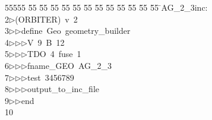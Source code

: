%
%
\begin{tabbing}
55555 \= 55 \= 55 \= 55 \= 55 \= 55 \= 55 \= 55 \= 55 \= 55 \= 55 \= 55 \= 55 \= \>AG\_2\_3inc:\\[0pt]
2\>$\triangleright$\>(ORBITER)\ v\ 2\ \\[0pt]
3\>$\triangleright$\>$\triangleright$\>define\ Geo\ geometry\_builder\ \\[0pt]
4\>$\triangleright$\>$\triangleright$\>$\triangleright$\>V\ 9\ B\ 12\ \\[0pt]
5\>$\triangleright$\>$\triangleright$\>$\triangleright$\>TDO\ 4\ fuse\ 1\ \\[0pt]
6\>$\triangleright$\>$\triangleright$\>$\triangleright$\>fname\_GEO\ AG\_2\_3\ \\[0pt]
7\>$\triangleright$\>$\triangleright$\>$\triangleright$\>test\ 3456789\ \\[0pt]
8\>$\triangleright$\>$\triangleright$\>$\triangleright$\>output\_to\_inc\_file\ \\[0pt]
9\>$\triangleright$\>$\triangleright$\>end\\[0pt]
10\>\end{tabbing}
